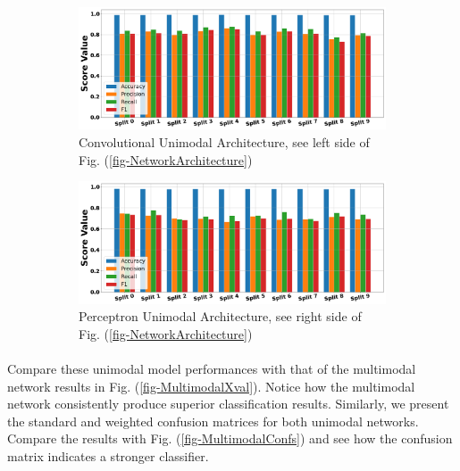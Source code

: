 \documentclass[12pt,letterpaper]{article}
\begin{document}
\begin{figure}[H]
	
	\begin{subfigure}[b]{0.9\textwidth}
	\centering
	\includegraphics[scale=0.3]{../FiguresMetrics/AvgXval-Convolution}
	\caption{Convolutional Unimodal Architecture, see left side of Fig. (\ref{fig-NetworkArchitecture})}
	\end{subfigure}	
	
	\begin{subfigure}[b]{0.9\textwidth}
	\centering
	\includegraphics[scale=0.3]{../FiguresMetrics/AvgXval-Perceptron}
	\caption{Perceptron Unimodal Architecture, see right side of Fig. (\ref{fig-NetworkArchitecture})}
	\end{subfigure}

	\caption{}
	\label{fig-UnimodalXVal}
\end{figure}

\paragraph*{}Compare these unimodal model performances with that of the multimodal network results in Fig. (\ref{fig-MultimodalXval}). Notice how the multimodal network consistently produce superior classification results. Similarly, we present the standard and weighted confusion matrices for both unimodal networks. Compare the results with Fig. (\ref{fig-MultimodalConfs}) and see how the confusion matrix indicates a stronger classifier.
\end{document}
